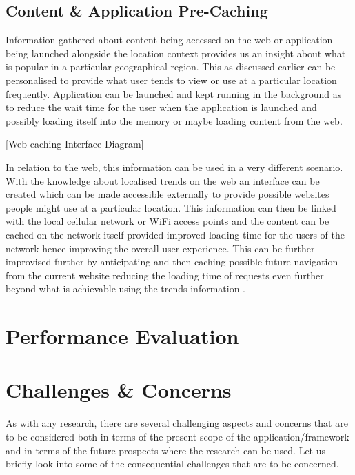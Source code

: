 \documentclass[12pt]{report}
\begin{document}
\section{Content \& Application Pre-Caching}

Information gathered about content being accessed on the web or application being launched alongside the location context provides us an insight about what is popular in a particular geographical region. This as discussed earlier can be personalised to provide what user tends to view or use at a particular location frequently. Application can be launched and kept running in the background as to reduce the wait time for the user when the application is launched and possibly loading itself into the memory or maybe loading content from the web.

[Web caching Interface Diagram]

In relation to the web, this information can be used in a very different scenario. With the knowledge about localised trends on the web an interface can be created which can be made accessible externally to provide possible websites people might use at a particular location. This information can then be linked with the local cellular network or WiFi access points and the content can be cached on the network itself provided improved loading time for the users of the network hence improving the overall user experience. This can be further improvised further by anticipating and then caching possible future navigation from the current website reducing the loading time of requests even further beyond what is achievable using the trends information \cite{cheluvaraju2011anticipatory}.

\chapter{Performance Evaluation}
\label{PeformanceEval}

\chapter{Challenges \& Concerns}
\label{challenges}

As with any research, there are several challenging aspects and concerns that are to be considered both in terms of the present scope of the application/framework and in terms of the future prospects where the research can be used. Let us briefly look into some of the consequential challenges that are to be concerned.
\end{document}
